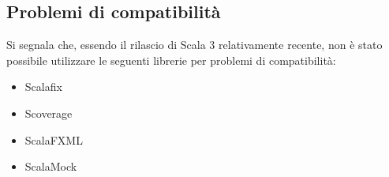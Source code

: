 \subsection{Problemi di compatibilità}
Si segnala che, essendo il rilascio di Scala 3 relativamente recente, non è stato possibile utilizzare
le seguenti librerie per problemi di compatibilità:
\begin{itemize}
    \item Scalafix
    \item Scoverage
    \item ScalaFXML
    \item ScalaMock
\end{itemize}
